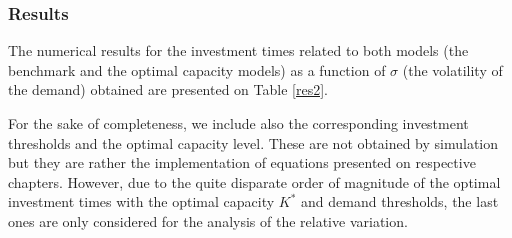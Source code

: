 %
%
%
%
%
%
%


\subsubsection{Results}

The numerical results for the investment times related to both models (the benchmark and the optimal capacity models) as a function of $\sigma$ (the volatility of the demand) obtained are presented on Table \ref{res2}. 

For the sake of completeness, we include also the corresponding investment thresholds and the optimal capacity level. These are not obtained by simulation but they are rather the implementation of equations presented on respective chapters.
However, due to the quite disparate order of magnitude of the optimal investment times with the optimal capacity $K^*$ and demand thresholds, the last ones are only considered for the analysis of the relative variation.

